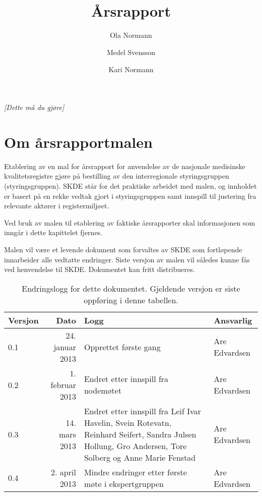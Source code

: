 \documentclass[norsk, a4paper, twocolumn]{report}
\title{\registernavn \\ \textbf{Årsrapport \the\year}}
\author[1]{Ola Normann}
\author[2]{Medel Svensson}
\author[1]{Kari Normann}
\affil[1]{et Sykehus, et Foretak, et Sted}
\affil[2]{en annen adresse, et annet Sted}
\newcommand{\guide}[1] {
	\textit{[\textcolor{guidegray}{#1}]}
	}
\begin{document}
\maketitle

\guide{Dette må du gjøre}

\onecolumn



\chapter*{Om årsrapportmalen}
Etablering av en mal for årsrapport for anvendelse av de nasjonale medisinske
kvalitetsregistre gjøre på bestilling av den interregionale styringsgruppen
(styringsgruppen).
SKDE står for det praktiske arbeidet med malen, og innholdet er basert på
en rekke vedtak gjort i styringsgruppen samt innspill til justering fra
relevante aktører i registermiljøet.

Ved bruk av malen til etablering av faktiske årsrapporter skal informasjonen
som inngår i dette kapittelet fjernes.

Malen vil være et levende dokument som
forvaltes av SKDE som fortløpende innarbeider alle vedtatte endringer. Siste
versjon av malen vil således kunne fås ved henvendelse til SKDE. Dokumentet
kan fritt distribueres.

\begin{table}[ht]
  \centering
  \begin{tabular}{lrp{8cm}l}
    \hline
    Versjon & Dato & Logg & Ansvarlig \\
    \hline
    0.1 & 24. januar 2013 & Opprettet første gang & Are Edvardsen \\
    0.2 & 1. februar 2013 & Endret etter innspill fra nodemøtet &
    Are Edvardsen \\
    0.3 & 14. mars 2013 & Endret etter innspill fra Leif Ivar Havelin,
    Svein Rotevatn,
    Reinhard Seifert, Sandra Julsen Hollung, Gro Andersen, Tore Solberg og
    Anne Marie Fenstad & Are Edvardsen \\
    0.4 & 2. april 2013 & Mindre endringer etter første møte i ekspertgruppen &
    Are Edvardsen \\
    \hline
  \end{tabular}
  \caption{Endringslogg for dette dokumentet. Gjeldende versjon er siste
  oppføring i denne tabellen.}
  \label{tab:log}
\end{table}



\tableofcontents
\end{document}
